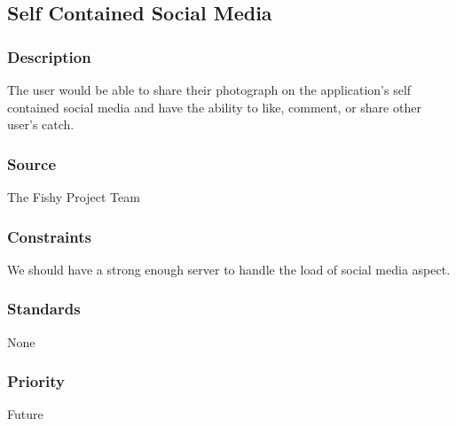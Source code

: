\subsection{Self Contained Social Media}
\subsubsection{Description}
The user would be able to share their photograph on the application's self contained social media and have the ability to like, comment, or share other user's catch.
\subsubsection{Source}
The Fishy Project Team
\subsubsection{Constraints}
We should have a strong enough server to handle the load of social media aspect.
\subsubsection{Standards}
None
\subsubsection{Priority}
Future